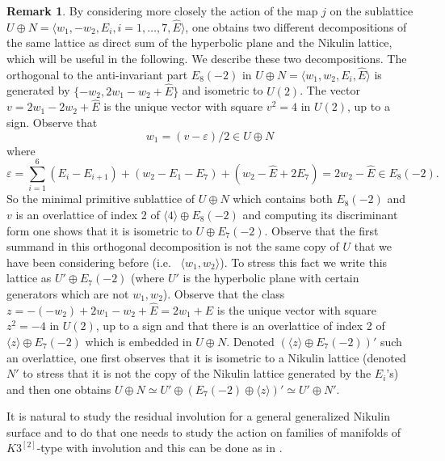 \documentclass{amsart}
\theoremstyle{definition}
\newtheorem{rem}[thm]{Remark}
\numberwithin{equation}{section}
\numberwithin{equation}{section} \theoremstyle{definition}
\begin{document}
\begin{rem}\label{rem: different U+N decompostions}
By considering more closely the action of the map $j$ on the sublattice $U\oplus N=\langle w_1,-w_2,E_i,i=1,\ldots, 7, \hat{E}\rangle$, one obtains two different decompositions of the same lattice as direct sum of the hyperbolic plane and the Nikulin lattice, which will be useful in the following. We describe these two decompositions.
The orthogonal to the anti-invariant part $E_8(-2)$ in $U\oplus N=\langle w_1,w_2,E_i,\hat{E}\rangle$ is generated by $\{-w_2,2w_1-w_2+\hat{E}\}$ and isometric to $U(2)$. 
The vector $v=2w_1-2w_2+\hat{E}$ is the unique vector with square $v^2=4$ in $U(2)$, up to a sign. %
Observe that $$w_1=\left(v-\varepsilon\right)/2\in U\oplus N$$ where $$\varepsilon=\sum_{i=1}^6(E_i-E_{i+1})+(w_2-E_1-E_7)+(w_2-\hat{E}+2E_7)=2w_2-\hat{E}\in E_8(-2).$$ So the minimal primitive sublattice of $U\oplus N$ which contains both $E_8(-2)$ and $v$ is an overlattice of index 2 of $\langle 4\rangle\oplus E_8(-2)$ and computing its discriminant form one shows that it is isometric to $U\oplus E_7(-2)$. Observe that the first summand in this orthogonal decomposition is not the same copy of $U$ that we have been considering before (i.e.~  $\langle w_1,w_2\rangle$). To stress this fact we write this lattice as $U'\oplus E_7(-2)$ (where $U'$ is the hyperbolic plane with certain generators which are not $w_1,w_2$). Observe that the class $z=-(-w_2)+2w_1-w_2+\hat{E}=2w_1+\hat{E}$ is the unique vector with square $z^2=-4$ in $U(2)$, up to a sign and that there is an overlattice of index 2 of $\langle z\rangle\oplus E_7(-2)$ which is embedded in $U\oplus N$. Denoted $(\langle z\rangle\oplus E_7(-2))'$ such an overlattice, one first observes that it is isometric to a Nikulin lattice (denoted $N'$ to stress that it is not the copy of the Nikulin lattice generated by the $E_i$'s) and then one obtains $U\oplus N\simeq U'\oplus (E_7(-2)\oplus\langle z\rangle)'\simeq U'\oplus N'$.
\end{rem}

It is natural to study the residual involution for a general generalized Nikulin surface and to do that one needs to study the action on families of manifolds of $K3^{[2]}$-type with involution and this can be done as in \cite[Section 8.4]{BP}.
 
\end{document}
